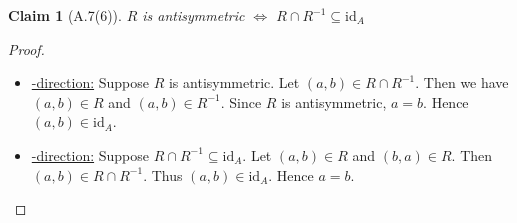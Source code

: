 \documentclass[12pt,aspectratio=169]{beamer}
\theoremstyle{claim}
\newtheorem{claim}[theorem]{Claim}%
\begin{document}
\begin{frame}
    \begin{claim}[A.7(6)]
        $R$ is antisymmetric $\Leftrightarrow$ $R \cap R^{-1} \subseteq \mathrm{id}_A$
    \end{claim}
    \begin{proof}\pause
        \begin{itemize}
            \item \underline{\Rightarrow-direction:}
                Suppose $R$ is antisymmetric.\pause
                Let $(a,b) \in R \cap R^{-1}$.\pause
                Then we have $(a,b) \in R$ and $(a,b) \in R^{-1}$.\pause
                Since $R$ is antisymmetric, $a=b$. Hence $(a,b) \in \mathrm{id}_A$.\pause
            \item \underline{\Leftarrow-direction:}
                Suppose $R \cap R^{-1} \subseteq \mathrm{id}_A$.\pause
                Let $(a,b) \in R$ and $(b,a) \in R$.\pause
                Then $(a,b) \in R \cap R^{-1}$.\pause
                Thus $(a,b) \in \mathrm{id}_A$.\pause
                Hence $a = b$.
        \end{itemize}
    \end{proof}
\end{frame}
\end{document}
